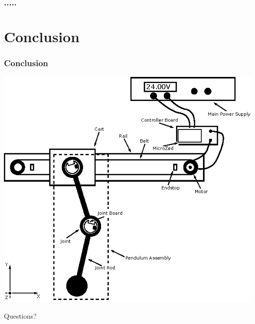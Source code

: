 \documentclass[mathserif]{beamer}
\begin{document}
\begin{frame}[c]\frametitle{.....}
    \begin{figure}[h]
		\centering
		
	\end{figure}
\end{frame}


\section{Conclusion}

\begin{frame}[t]\frametitle{Conclusion}
	\centering
	\includegraphics[scale=1.1]{graphics/system_overview}
\end{frame}

\begin{frame}[standout]
  Questions?
\end{frame}
\end{document}
